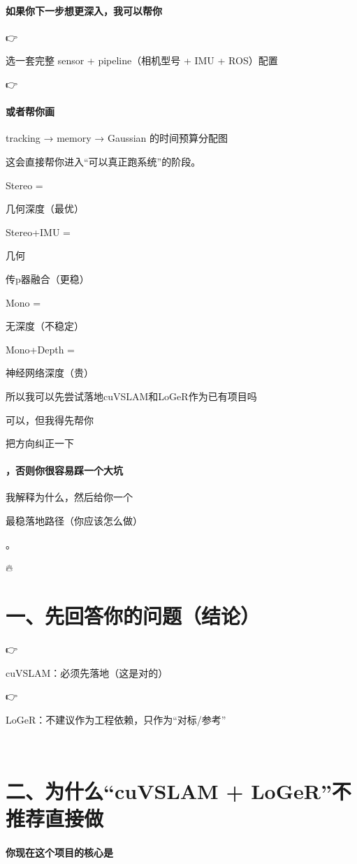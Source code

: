 \documentclass[12pt]{article}
\begin{document}
\paragraph{如果你下一步想更深入，我可以帮你}
👉

选一套完整 sensor + pipeline（相机型号 + IMU + ROS）配置

👉

\paragraph{或者帮你画}
tracking → memory → Gaussian 的时间预算分配图

这会直接帮你进入“可以真正跑系统”的阶段。

Stereo =

⼏何深度（最优）

Stereo+IMU =

⼏何

传p器融合（更稳）

Mono =

⽆深度（不稳定）

Mono+Depth =

神经⽹络深度（贵）

所以我可以先尝试落地cuVSLAM和LoGeR作为已有项目吗

可以，但我得先帮你

把方向纠正一下

\paragraph{，否则你很容易踩一个大坑}
我解释为什么，然后给你一个

最稳落地路径（你应该怎么做）

。

🔥

\section{一、先回答你的问题（结论）}
👉

cuVSLAM：必须先落地（这是对的）

👉

LoGeR：不建议作为工程依赖，只作为“对标/参考”

🧠

\section{二、为什么“cuVSLAM + LoGeR”不推荐直接做}
\paragraph{你现在这个项目的核心是}
\end{document}
